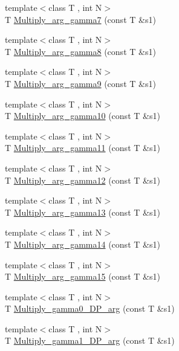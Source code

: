 \begin{DoxyCompactItemize}
\item 
{\footnotesize template$<$class T , int N$>$ }\\T \mbox{\hyperlink{namespaceENSEM_af6533488ba5049e3bff7f310721cbb7c}{Multiply\+\_\+arg\+\_\+gamma7}} (const T \&s1)
\item 
{\footnotesize template$<$class T , int N$>$ }\\T \mbox{\hyperlink{namespaceENSEM_a0e88a49ab7d0591df524cdca32ea608b}{Multiply\+\_\+arg\+\_\+gamma8}} (const T \&s1)
\item 
{\footnotesize template$<$class T , int N$>$ }\\T \mbox{\hyperlink{namespaceENSEM_a35776b4c580934c4456e696629bc8395}{Multiply\+\_\+arg\+\_\+gamma9}} (const T \&s1)
\item 
{\footnotesize template$<$class T , int N$>$ }\\T \mbox{\hyperlink{namespaceENSEM_adca6a0195009141b0fff947a5beae7a5}{Multiply\+\_\+arg\+\_\+gamma10}} (const T \&s1)
\item 
{\footnotesize template$<$class T , int N$>$ }\\T \mbox{\hyperlink{namespaceENSEM_af82943ccca99d10c6f938ed0bf602a6c}{Multiply\+\_\+arg\+\_\+gamma11}} (const T \&s1)
\item 
{\footnotesize template$<$class T , int N$>$ }\\T \mbox{\hyperlink{namespaceENSEM_ad87f605b2c52a2e2163988dd6a162c6c}{Multiply\+\_\+arg\+\_\+gamma12}} (const T \&s1)
\item 
{\footnotesize template$<$class T , int N$>$ }\\T \mbox{\hyperlink{namespaceENSEM_a896031e37c4b82dc0dbce775f3a13202}{Multiply\+\_\+arg\+\_\+gamma13}} (const T \&s1)
\item 
{\footnotesize template$<$class T , int N$>$ }\\T \mbox{\hyperlink{namespaceENSEM_af623aded659b9d054073eda60b56ab49}{Multiply\+\_\+arg\+\_\+gamma14}} (const T \&s1)
\item 
{\footnotesize template$<$class T , int N$>$ }\\T \mbox{\hyperlink{namespaceENSEM_ad1bfb7d1fc1c7b777e7e1d92accbc1b7}{Multiply\+\_\+arg\+\_\+gamma15}} (const T \&s1)
\item 
{\footnotesize template$<$class T , int N$>$ }\\T \mbox{\hyperlink{namespaceENSEM_a70979a2e217f7ceece8d9505057fc050}{Multiply\+\_\+gamma0\+\_\+\+D\+P\+\_\+arg}} (const T \&s1)
\item 
{\footnotesize template$<$class T , int N$>$ }\\T \mbox{\hyperlink{namespaceENSEM_aa25e619806d7f439f5adb3d1102d28d0}{Multiply\+\_\+gamma1\+\_\+\+D\+P\+\_\+arg}} (const T \&s1)

\end{DoxyCompactItemize}
